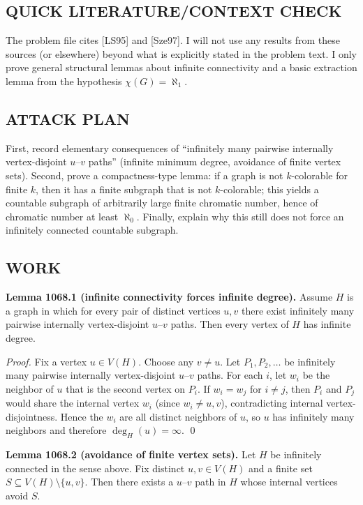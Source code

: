 \subsection*{QUICK LITERATURE/CONTEXT CHECK}
The problem file cites [LS95] and [Sze97].  I will not use any results from these sources (or elsewhere) beyond what is explicitly stated in the problem text.  I only prove general structural lemmas about infinite connectivity and a basic extraction lemma from the hypothesis $\chi(G)=\aleph_1$.

\subsection*{ATTACK PLAN}
First, record elementary consequences of ``infinitely many pairwise internally vertex-disjoint $u$--$v$ paths'' (infinite minimum degree, avoidance of finite vertex sets).  Second, prove a compactness-type lemma: if a graph is not $k$-colorable for finite $k$, then it has a finite subgraph that is not $k$-colorable; this yields a countable subgraph of arbitrarily large finite chromatic number, hence of chromatic number at least $\aleph_0$.  Finally, explain why this still does not force an infinitely connected countable subgraph.

\subsection*{WORK}
\textbf{Lemma 1068.1 (infinite connectivity forces infinite degree).}
Assume $H$ is a graph in which for every pair of distinct vertices $u,v$ there exist infinitely many pairwise internally vertex-disjoint $u$--$v$ paths.
Then every vertex of $H$ has infinite degree.

\emph{Proof.}
Fix a vertex $u\in V(H)$. Choose any $v\ne u$.
Let $P_1,P_2,\ldots$ be infinitely many pairwise internally vertex-disjoint $u$--$v$ paths.
For each $i$, let $w_i$ be the neighbor of $u$ that is the second vertex on $P_i$.
If $w_i=w_j$ for $i\ne j$, then $P_i$ and $P_j$ would share the internal vertex $w_i$ (since $w_i\ne u,v$), contradicting internal vertex-disjointness.
Hence the $w_i$ are all distinct neighbors of $u$, so $u$ has infinitely many neighbors and therefore $\deg_H(u)=\infty$.
\qed

\textbf{Lemma 1068.2 (avoidance of finite vertex sets).}
Let $H$ be infinitely connected in the sense above.  Fix distinct $u,v\in V(H)$ and a finite set $S\subseteq V(H)\setminus\{u,v\}$.  Then there exists a $u$--$v$ path in $H$ whose internal vertices avoid $S$.

